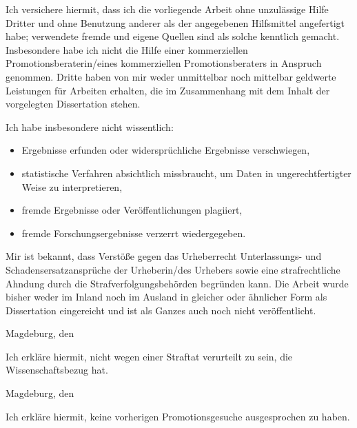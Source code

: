 \documentclass[oneside]{scrartcl}
\author{Timo Oster}
\date{26. April 2019}
\makeatletter
\let\theauthor\@author
\let\thedate\@date
\makeatother
\begin{document}
%
\vspace*{-\parskip}
Ich versichere hiermit, dass ich die vorliegende Arbeit ohne unzulässige Hilfe
Dritter und ohne Benutzung anderer als der angegebenen Hilfsmittel angefertigt
habe;
%
verwendete fremde und eigene Quellen sind als solche kenntlich gemacht.
%
Insbesondere habe ich nicht die Hilfe einer kommerziellen
Promotionsberaterin/eines kommerziellen Promotionsberaters in Anspruch genommen.
%
Dritte haben von mir weder unmittelbar noch mittelbar geldwerte Leistungen für
Arbeiten erhalten, die im Zusammenhang mit dem Inhalt der vorgelegten
Dissertation stehen.
%

%
Ich habe insbesondere nicht wissentlich:
%
\begin{itemize}
    \item Ergebnisse erfunden oder widersprüchliche Ergebnisse verschwiegen,
    \item statistische Verfahren absichtlich missbraucht, um Daten in
          ungerechtfertigter Weise zu interpretieren,
    \item fremde Ergebnisse oder Veröffentlichungen plagiiert,
    \item fremde Forschungsergebnisse verzerrt wiedergegeben.
\end{itemize}
%

%
Mir ist bekannt, dass Verstöße gegen das Urheberrecht Unterlassungs- und
Schadensersatzansprüche der Urheberin/des Urhebers sowie eine strafrechtliche
Ahndung durch die Strafverfolgungsbehörden begründen kann.
%
Die Arbeit wurde bisher weder im Inland noch im Ausland in gleicher oder
ähnlicher Form als Dissertation eingereicht und ist als Ganzes auch noch nicht
veröffentlicht.
%

\vspace*{\baselineskip}

%
\hfill{}Magdeburg, den \thedate
%

\vspace*{1.5cm}

%
\hfill{}\theauthor
%
\clearpage
%
%
Ich erkläre hiermit, nicht wegen einer Straftat verurteilt zu sein, die
Wissenschaftsbezug hat.
%

\vspace*{\baselineskip}

%
\hfill{}Magdeburg, den \thedate
%

\vspace*{1.5cm}

%
\hfill{}\theauthor
%
%
Ich erkläre hiermit, keine vorherigen Promotionsgesuche ausgesprochen zu haben.
%
\end{document}
